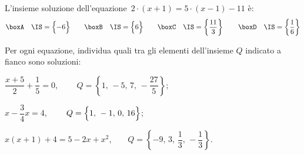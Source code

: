 \begin{esercizio}
\label{ese:13.49}
L'insieme soluzione dell'equazione~$2\cdot \left(x+1\right)=5\cdot \left(x-1\right)-11$ è:
\[\boxA\quad \IS=\Bigl\{-6\Bigr\}\qquad\boxB\quad \IS=\Bigl\{6\Bigr\}\qquad\boxC\quad \IS=\left\{\dfrac{11}{3}\right\}\qquad\boxD\quad \IS=\left\{\dfrac{1}{6}\right\}\]
\end{esercizio}

\begin{esercizio}
\label{ese:13.50}
Per ogni equazione, individua quali tra gli elementi dell'insieme $Q$ indicato a fianco sono soluzioni:
\begin{enumeratea}
\spazielenx
 \item $\dfrac{x+5}{2}+\dfrac{1}{5}=0$, $\qquad Q=\left\{1\text{,~}-5\text{,~}7\text{,~}-\dfrac{27}{5}\right\}$;
 \item $x-\dfrac{3}{4}x=4$, $\qquad Q=\Bigl\{1\text{,~}-1\text{,~}0\text{,~}16\Bigr\}$;
 \item $x(x+1)+4=5-2x+x^{2}$,$\qquad Q=\left\{-9\text{,~}3\text{,~}\dfrac{1}{3}\text{,~}-\dfrac{1}{3}\right\}$.
\end{enumeratea}
\end{esercizio}

